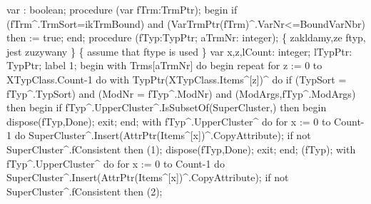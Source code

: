 \nwenddocs{}\endmoddef\nwstartdeflinemarkup\nwenddeflinemarkup
var : boolean;
procedure (var fTrm:TrmPtr);
begin
   if (fTrm^.TrmSort=ikTrmBound) and (VarTrmPtr(fTrm)^.VarNr<=BoundVarNbr)
   then  := true;
end;
\eatline
{}\nwendcode{}\nwdocspar
\nwenddocs{}\endmoddef\nwstartdeflinemarkup\nwenddeflinemarkup
procedure (fTyp:TypPtr; aTrmNr: integer);
\{ zakldamy,ze ftyp, jest zuzywany \} \{ assume that ftype is used \}
var
   x,z,lCount: integer;
   lTypPtr: TypPtr;
label 1;
begin
   with Trms[aTrmNr] do
   begin
      repeat
         for z := 0 to XTypClass.Count-1 do
            with TypPtr(XTypClass.Items^[z])^ do
               if (TypSort = fTyp^.TypSort) and (ModNr = fTyp^.ModNr) and
                     (ModArgs,fTyp^.ModArgs) then
               begin
                  if fTyp^.UpperCluster^.IsSubsetOf(SuperCluster,) then
                  begin
                     dispose(fTyp,Done);
                     exit;
                  end;
                  with fTyp^.UpperCluster^ do
                     for x := 0 to Count-1 do
                        SuperCluster^.Insert(AttrPtr(Items^[x])^.CopyAttribute);
                  if not SuperCluster^.fConsistent
                  then (1);
                  dispose(fTyp,Done);
                  exit;
               end;
         (fTyp);
         with fTyp^.UpperCluster^ do
            for x := 0 to Count-1 do
               SuperCluster^.Insert(AttrPtr(Items^[x])^.CopyAttribute);
         if not SuperCluster^.fConsistent then (2);
